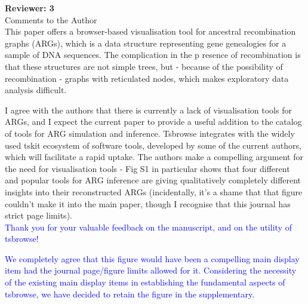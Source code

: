 \documentclass{article}
\begin{document}
\textbf{Reviewer: 3}\\

Comments to the Author\\
This paper offers a browser-based visualisation tool for ancestral recombination graphs (ARGs), which is 
a data structure representing gene genealogies for a sample of DNA sequences. The complication in the p
resence of recombination is that these structures are not simple trees, but - because of the possibility 
of recombination - graphs with reticulated nodes, which makes exploratory data analysis difficult.

I agree with the authors that there is currently a lack of visualisation tools for ARGs, and I expect the 
current paper to provide a useful addition to the catalog of tools for ARG simulation and inference. Tsbrowse 
integrates with the widely used tskit ecosystem of software tools, developed by some of the current authors, 
which will facilitate a rapid uptake. The authors make a compelling argument for the need for visualisation 
tools - Fig S1 in particular shows that four different and popular tools for ARG inference are giving 
qualitatively completely different insights into their reconstructed ARGs (incidentally, it's a shame that 
that figure couldn't make it into the main paper, though I recognise that this journal has strict page limits).\\
\textcolor{blue}{Thank you for your valuable feedback on the manuscript, and on the utility of tsbrowse!}

\textcolor{blue}{We completely agree that this figure would have been a compelling main display item had the journal 
page/figure limits allowed for it. Considering the necessity of the existing main display items in establishing 
the fundamental aspects of tsbrowse, we have decided to retain the figure in the supplementary.}\\
\end{document}
